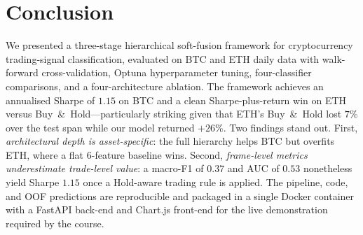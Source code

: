 \documentclass[conference]{IEEEtran}
\begin{document}
\section{Conclusion}
We presented a three-stage hierarchical soft-fusion framework for cryptocurrency trading-signal classification, evaluated on BTC and ETH daily data with walk-forward cross-validation, Optuna hyperparameter tuning, four-classifier comparisons, and a four-architecture ablation. The framework achieves an annualised Sharpe of $1.15$ on BTC and a clean Sharpe-plus-return win on ETH versus Buy~\&~Hold---particularly striking given that ETH's Buy~\&~Hold lost $7\%$ over the test span while our model returned $+26\%$. Two findings stand out. First, \emph{architectural depth is asset-specific}: the full hierarchy helps BTC but overfits ETH, where a flat 6-feature baseline wins. Second, \emph{frame-level metrics underestimate trade-level value}: a macro-F1 of $0.37$ and AUC of $0.53$ nonetheless yield Sharpe $1.15$ once a Hold-aware trading rule is applied. The pipeline, code, and OOF predictions are reproducible and packaged in a single Docker container with a FastAPI back-end and Chart.js front-end for the live demonstration required by the course.

\FloatBarrier  %



\end{document}

